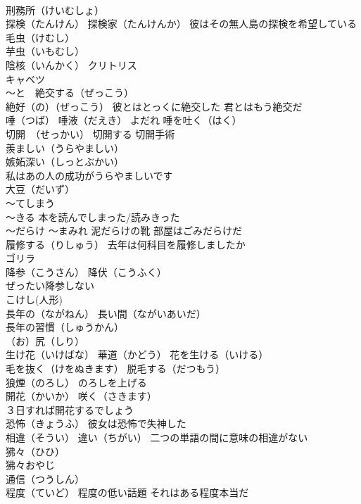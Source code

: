 \documentclass[8pt]{extreport}
\begin{document}
\begin{CJK}{UTF8}{min}
\\	刑務所（けいむしょ）
\\	探検（たんけん） 探検家（たんけんか） 彼はその無人島の探検を希望している
\\	毛虫（けむし）
\\	芋虫（いもむし）
\\	陰核（いんかく） クリトリス
\\	キャベツ
\\	～と　絶交する（ぜっこう） 
\\	絶好（の）（ぜっこう） 彼とはとっくに絶交した 君とはもう絶交だ
\\	唾（つば） 唾液（だえき） よだれ 唾を吐く（はく）
\\	切開　（せっかい） 切開する 切開手術
\\	羨ましい（うらやましい）
\\	嫉妬深い（しっとぶかい）
\\	私はあの人の成功がうらやましいです
\\	大豆（だいず）
\\	～てしまう 
\\	～きる 本を読んでしまった/読みきった
\\	～だらけ ～まみれ 泥だらけの靴 部屋はごみだらけだ
\\	履修する（りしゅう） 去年は何科目を履修しましたか
\\	ゴリラ
\\	降参（こうさん） 降伏（こうふく）
\\	ぜったい降参しない
\\	こけし(人形)
\\	長年の（ながねん） 長い間（ながいあいだ）
\\	長年の習慣（しゅうかん）
\\	（お）尻（しり）
\\	生け花（いけばな） 華道（かどう） 花を生ける（いける）
\\	毛を抜く（けをぬきます） 脱毛する（だつもう）
\\	狼煙（のろし） のろしを上げる
\\	開花（かいか） 咲く（さきます） 
\\	３日すれば開花するでしょう
\\	恐怖（きょうふ） 彼女は恐怖で失神した
\\	相違（そうい） 違い（ちがい） 二つの単語の間に意味の相違がない
\\	狒々（ひひ）
\\	狒々おやじ
\\	通信（つうしん）
\\	程度（ていど） 程度の低い話題 それはある程度本当だ

\end{CJK}
\end{document}
